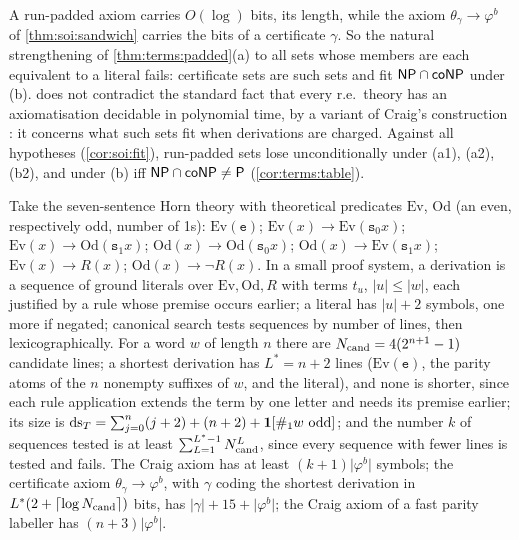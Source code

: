 A run-padded axiom carries $O(\log)$ bits, its length, while the axiom $\theta_\gamma\to\varphi^b$ of \cref{thm:soi:sandwich} carries the bits of a certificate $\gamma$. So the natural strengthening of \cref{thm:terms:padded}(a) to all sets whose members are each equivalent to a literal fails: certificate sets are such sets and fit $\mathsf{NP}\cap\mathsf{coNP}$ under (b).  does not contradict the standard fact that every r.e.\ theory has an axiomatisation decidable in polynomial time, by a variant of Craig's construction \citep{krajicek2025proof}: it concerns what such sets fit when derivations are charged. Against all hypotheses (\cref{cor:soi:fit}), run-padded sets lose unconditionally under (a1), (a2), (b2), and under (b) iff $\mathsf{NP}\cap\mathsf{coNP}\ne\mathsf{P}$ (\cref{cor:terms:table}).

\begin{example}\label{ex:terms:craig}
Take the seven-sentence Horn theory with theoretical predicates $\mathrm{Ev}$, $\mathrm{Od}$ (an even, respectively odd, number of 1s): $\mathrm{Ev}(\mathtt e)$; $\mathrm{Ev}(x)\to\mathrm{Ev}(\mathtt s_0x)$; $\mathrm{Ev}(x)\to\mathrm{Od}(\mathtt s_1x)$; $\mathrm{Od}(x)\to\mathrm{Od}(\mathtt s_0x)$; $\mathrm{Od}(x)\to\mathrm{Ev}(\mathtt s_1x)$; $\mathrm{Ev}(x)\to R(x)$; $\mathrm{Od}(x)\to\neg R(x)$. In a small proof system, a derivation is a sequence of ground literals over $\mathrm{Ev},\mathrm{Od},R$ with terms $t_u$, $\lvert u\rvert\le\lvert w\rvert$, each justified by a rule whose premise occurs earlier; a literal has $\lvert u\rvert+2$ symbols, one more if negated; canonical search tests sequences by number of lines, then lexicographically. For a word $w$ of length $n$ there are $N_{\rm cand}=4(2^{n+1}-1)$ candidate lines; a shortest derivation has $L^*=n+2$ lines ($\mathrm{Ev}(\mathtt e)$, the parity atoms of the $n$ nonempty suffixes of $w$, and the literal), and none is shorter, since each rule application extends the term by one letter and needs its premise earlier; its size is $\mathrm{ds}_T=\sum_{j=0}^n(j+2)+(n+2)+\mathbf{1}[\#_1w\text{ odd}]$; and the number $k$ of sequences tested is at least $\sum_{L=1}^{L^*-1}N_{\rm cand}^L$, since every sequence with fewer lines is tested and fails. The Craig axiom has at least $(k+1)\lvert\varphi^b\rvert$ symbols; the certificate axiom $\theta_\gamma\to\varphi^b$, with $\gamma$ coding the shortest derivation in $L^*(2+\lceil\log N_{\rm cand}\rceil)$ bits, has $\lvert\gamma\rvert+15+\lvert\varphi^b\rvert$; the Craig axiom of a fast parity labeller has $(n+3)\lvert\varphi^b\rvert$.
\end{example}

